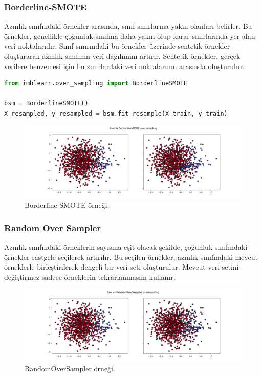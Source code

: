 \subsubsection{Borderline-SMOTE}
Azınlık sınıfındaki örnekler arasında, sınıf sınırlarına yakın olanları belirler. Bu örnekler, genellikle çoğunluk sınıfına daha yakın olup karar sınırlarında yer alan veri noktalarıdır. Sınıf sınırındaki bu örnekler üzerinde sentetik örnekler oluşturarak azınlık sınıfının veri dağılımını artırır. Sentetik örnekler, gerçek verilere benzemesi için bu sınırlardaki veri noktalarının arasında oluşturulur.

\begin{lstlisting}[language=Python]
from imblearn.over_sampling import BorderlineSMOTE

bsm = BorderlineSMOTE()
X_resampled, y_resampled = bsm.fit_resample(X_train, y_train)
\end{lstlisting}

\begin{figure}[h]
    \centering
    \includegraphics[width=1\textwidth]{images/Raw vs BorderlineSMOTE oversampling.png}
    \caption{Borderline-SMOTE örneği.}
    \label{fig:enter-label}
\end{figure}

\newpage

\subsubsection{Random Over Sampler}
Azınlık sınıfındaki örneklerin sayısına eşit olacak şekilde, çoğunluk sınıfındaki örnekler rastgele seçilerek artırılır. Bu seçilen örnekler, azınlık sınıfındaki mevcut örneklerle birleştirilerek dengeli bir veri seti oluşturulur. Mevcut veri setini değiştirmez sadece örneklerin tekrarlanmasını kullanır.

\begin{figure}[h]
    \centering
    \includegraphics[width=1\textwidth]{images/Raw vs RandomOverSampler oversampling.png}
    \caption{RandomOverSampler örneği.}
    \label{fig:enter-label}
\end{figure}

